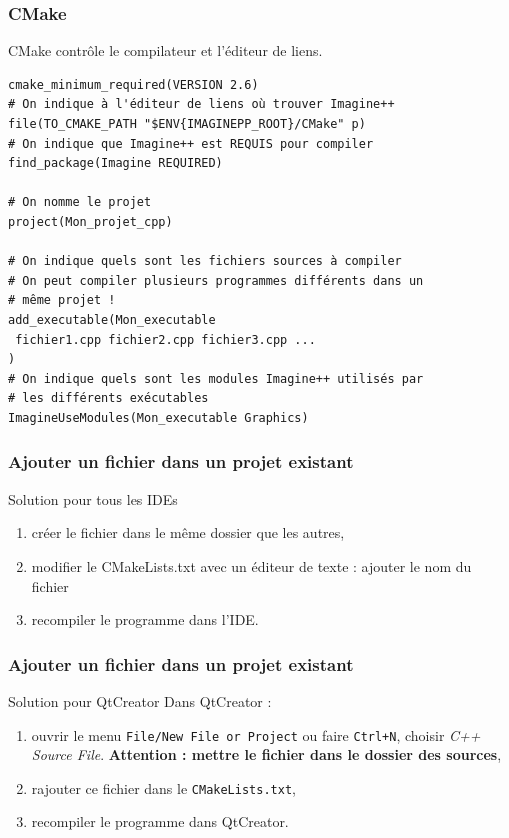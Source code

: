 \begin{frame}[fragile]
\frametitle{CMake}
CMake contrôle le compilateur et l'éditeur de liens.

\begin{verbatim}
cmake_minimum_required(VERSION 2.6)
# On indique à l'éditeur de liens où trouver Imagine++
file(TO_CMAKE_PATH "$ENV{IMAGINEPP_ROOT}/CMake" p)
# On indique que Imagine++ est REQUIS pour compiler
find_package(Imagine REQUIRED)

# On nomme le projet
project(Mon_projet_cpp)

# On indique quels sont les fichiers sources à compiler
# On peut compiler plusieurs programmes différents dans un
# même projet !
add_executable(Mon_executable
 fichier1.cpp fichier2.cpp fichier3.cpp ...
)
# On indique quels sont les modules Imagine++ utilisés par
# les différents exécutables
ImagineUseModules(Mon_executable Graphics)
\end{verbatim}

\end{frame}


\begin{frame}
	\frametitle{Ajouter un fichier dans un projet existant}
	
	\begin{block}{Solution pour tous les IDEs}
		\begin{enumerate}
			\item créer le fichier dans le même dossier que les autres,
			\item modifier le CMakeLists.txt avec un éditeur de texte :
			ajouter le nom du fichier
			\item recompiler le programme dans l'IDE.
		\end{enumerate}
	\end{block}
	
\end{frame}

\begin{frame}
	\frametitle{Ajouter un fichier dans un projet existant}
	
	\begin{block}{Solution pour QtCreator}
		Dans QtCreator :
		\begin{enumerate}
		\item ouvrir le menu \texttt{File/New File or Project} ou faire \texttt{Ctrl+N}, choisir \textit{C++ Source File}. \textbf{Attention : mettre le fichier dans le dossier des sources},
		\item rajouter ce fichier dans le \texttt{CMakeLists.txt},
		\item recompiler le programme dans QtCreator.
		\end{enumerate}
	\end{block}
	
\end{frame}

